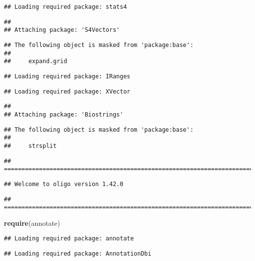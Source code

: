 \documentclass[]{article}
\newenvironment{Shaded}{\begin{snugshade}}{\end{snugshade}}
\newcommand{\KeywordTok}[1]{\textcolor[rgb]{0.13,0.29,0.53}{\textbf{#1}}}
\newcommand{\NormalTok}[1]{#1}
\begin{document}
\begin{verbatim}
## Loading required package: stats4
\end{verbatim}

\begin{verbatim}
## 
## Attaching package: 'S4Vectors'
\end{verbatim}

\begin{verbatim}
## The following object is masked from 'package:base':
## 
##     expand.grid
\end{verbatim}

\begin{verbatim}
## Loading required package: IRanges
\end{verbatim}

\begin{verbatim}
## Loading required package: XVector
\end{verbatim}

\begin{verbatim}
## 
## Attaching package: 'Biostrings'
\end{verbatim}

\begin{verbatim}
## The following object is masked from 'package:base':
## 
##     strsplit
\end{verbatim}

\begin{verbatim}
## ===========================================================================
\end{verbatim}

\begin{verbatim}
## Welcome to oligo version 1.42.0
\end{verbatim}

\begin{verbatim}
## ===========================================================================
\end{verbatim}

\begin{Shaded}
\begin{Highlighting}[]
\KeywordTok{require}\NormalTok{(annotate)}
\end{Highlighting}
\end{Shaded}

\begin{verbatim}
## Loading required package: annotate
\end{verbatim}

\begin{verbatim}
## Loading required package: AnnotationDbi
\end{verbatim}
\end{document}
